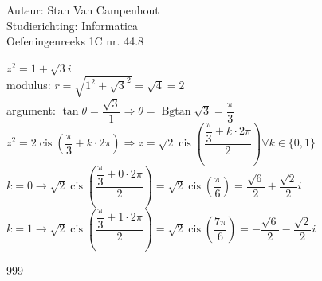 \documentclass[a4paper]{article}
\begin{document}
  
\noindent \large Auteur: Stan Van Campenhout \\
\noindent \large Studierichting:  Informatica\\
\noindent \large Oefeningenreeks 1C nr. 44.8\\

\medskip

\normalsize

$z^2 = 1 + \sqrt{3}i $\\

modulus: $r = \sqrt{1^2 + \sqrt{3}^2} = \sqrt{4} = 2 $\\

argument: $\tan\theta = \dfrac{\sqrt{3}}{1} \Rightarrow \theta = \operatorname{Bgtan}\sqrt{3} = \dfrac{\pi}{3} $\\

$ z^2 = 2 \operatorname{cis}\left(\dfrac{\pi}{3} + k \cdot 2\pi\right) \Rightarrow z = \sqrt{2} \operatorname{cis}\left(\dfrac{\dfrac{\pi}{3} + k \cdot 2\pi}{2}\right)
\forall k \in \{0 , 1\} $\\

$ k = 0 \rightarrow \sqrt{2} \operatorname{cis}\left(\dfrac{\dfrac{\pi}{3} + 0 \cdot 2\pi}{2}\right) = \sqrt{2} \operatorname{cis}\left(\dfrac{\pi}{6}\right) 
= \dfrac{\sqrt{6}}{2} + \dfrac{\sqrt{2}}{2}i $\\

$ k = 1 \rightarrow \sqrt{2} \operatorname{cis}\left(\dfrac{\dfrac{\pi}{3} + 1 \cdot 2\pi}{2}\right) = \sqrt{2} \operatorname{cis}\left(\dfrac{7\pi}{6}\right) 
= -\dfrac{\sqrt{6}}{2} - \dfrac{\sqrt{2}}{2}i $\\

\begin{thebibliography}{999}
\end{thebibliography}
\end{document}
